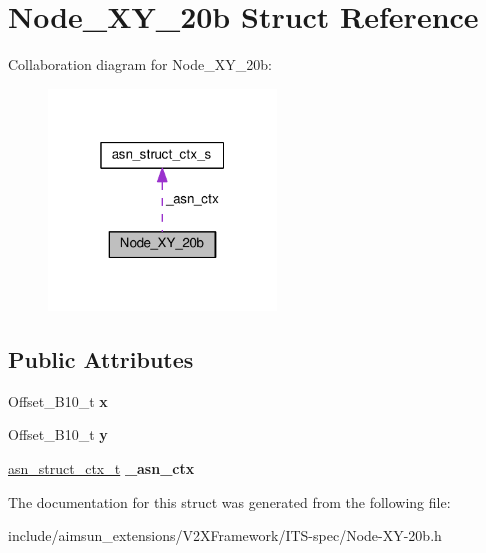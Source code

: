 \hypertarget{structNode__XY__20b}{}\section{Node\+\_\+\+X\+Y\+\_\+20b Struct Reference}
\label{structNode__XY__20b}


Collaboration diagram for Node\+\_\+\+X\+Y\+\_\+20b\+:\nopagebreak
\begin{figure}[H]
\begin{center}
\leavevmode
\includegraphics[width=172pt]{structNode__XY__20b__coll__graph}
\end{center}
\end{figure}
\subsection*{Public Attributes}
\begin{DoxyCompactItemize}
\item 
Offset\+\_\+\+B10\+\_\+t {\bfseries x}\hypertarget{structNode__XY__20b_a14c2148c3ce922f5b91a9b15d865b847}{}\label{structNode__XY__20b_a14c2148c3ce922f5b91a9b15d865b847}

\item 
Offset\+\_\+\+B10\+\_\+t {\bfseries y}\hypertarget{structNode__XY__20b_ade24d21c78a7ab8c1f2f6d9aeb79ec13}{}\label{structNode__XY__20b_ade24d21c78a7ab8c1f2f6d9aeb79ec13}

\item 
\hyperlink{structasn__struct__ctx__s}{asn\+\_\+struct\+\_\+ctx\+\_\+t} {\bfseries \+\_\+asn\+\_\+ctx}\hypertarget{structNode__XY__20b_a5354b2264ca8704ad7d2fb8116a055c2}{}\label{structNode__XY__20b_a5354b2264ca8704ad7d2fb8116a055c2}

\end{DoxyCompactItemize}


The documentation for this struct was generated from the following file\+:\begin{DoxyCompactItemize}
\item 
include/aimsun\+\_\+extensions/\+V2\+X\+Framework/\+I\+T\+S-\/spec/Node-\/\+X\+Y-\/20b.\+h\end{DoxyCompactItemize}
